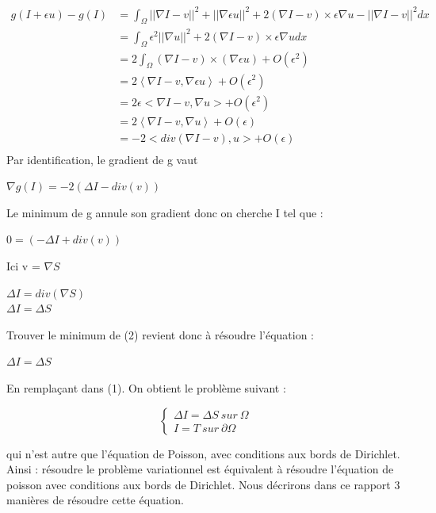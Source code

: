 \begin{equation*} 
\left.
\begin{aligned}
    g(I+\epsilon u) -g(I) &=  \int_\Omega || \nabla I - v||^2+ ||\nabla \epsilon u||^2 +2(\nabla I - v)\times \epsilon \nabla u  - ||\nabla I -v ||^2 dx\\
  &=  \int_\Omega \epsilon ^2||\nabla u||^2 +2(\nabla I - v)\times \epsilon \nabla u dx\\
    & = 2\int_\Omega (\nabla I - v) \times (\nabla \epsilon u ) + O (\epsilon^2) \\ 
    & = 2\left<\nabla I - v, \nabla \epsilon u \right> + O (\epsilon^2) \\ 
      &  =   2\epsilon<\nabla I - v,  \nabla u> + O (\epsilon^2) \\ 
         &  = 2\left<\nabla I - v,  \nabla u \right> + O (\epsilon)\\ 
    & =  -2 <div(\nabla I - v), u > + O (\epsilon)\\
\end{aligned}
\right.
\end{equation*}
Par identification, le gradient de g vaut 
\begin{center}
		$\nabla g(I) = -2(\Delta I-div( v))$
\end{center} 
Le minimum de g annule son gradient donc on cherche I tel que : 
\begin{center}
		$0= (-\Delta I+div( v))$
\end{center}
Ici v = $\nabla S$ 
\begin{center}
		$\Delta I =div(\nabla S)$\\
		$\Delta I = \Delta S$
		
\end{center} 

Trouver le minimum de (2) revient donc à résoudre l'équation : 
\begin{center}
$\Delta I = \Delta S$
\end{center}
En remplaçant dans (1). On obtient le problème suivant : 
\begin{center}
    \begin{equation*}
        \left\{
        \begin{aligned}
         \Delta I = \Delta S  \ sur \  \Omega \\
          I = T \ sur \  \partial \Omega
        \end{aligned}
        \right.
    \end{equation*}
\end{center}
qui n'est autre que l'équation de Poisson, avec conditions aux bords de Dirichlet. 
Ainsi : résoudre le problème variationnel est équivalent à résoudre l'équation de poisson avec conditions aux bords de Dirichlet. Nous décrirons dans ce rapport 3 manières de résoudre cette équation. 

